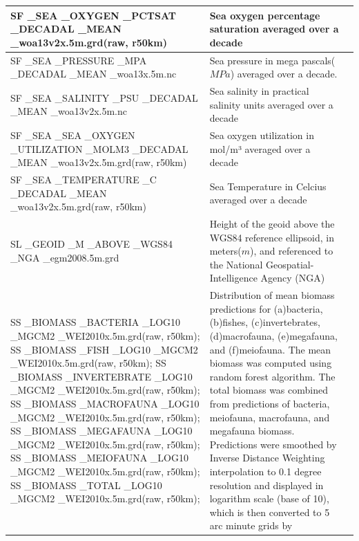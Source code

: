 \documentclass[journal abbreviation, manuscript]{copernicus}
\begin{document}
\begin{longtable}{|p{}|p{}|p{}|}
        SF \_SEA \_OXYGEN \_PCTSAT \_DECADAL \_MEAN \_woa13v2x.5m.grd(raw, r50km) & Sea oxygen percentage saturation averaged over a decade & \cite{WOA13X2013}\\
        \hline 
        SF \_SEA \_PRESSURE \_MPA \_DECADAL \_MEAN \_woa13x.5m.nc & Sea pressure in mega pascals($MPa$) averaged over a decade. & \cite{WOA13X2013} \\
        \hline 
        SF \_SEA \_SALINITY \_PSU \_DECADAL \_MEAN \_woa13v2x.5m.nc & Sea salinity in practical salinity units averaged over a decade & \cite{WOA13X2013} \\
        \hline 
        SF \_SEA \_SEA \_OXYGEN \_UTILIZATION \_MOLM3 \_DECADAL \_MEAN \_woa13v2x.5m.grd(raw, r50km) & Sea oxygen utilization in mol/m³ averaged over a decade &  \cite{WOA13X2013}\\
        \hline 
        SF \_SEA \_TEMPERATURE \_C \_DECADAL \_MEAN \_woa13v2x.5m.grd(raw, r50km) &  Sea Temperature in Celcius averaged over a decade & \cite{WOA13X2013} \\
        \hline 
        SL \_GEOID \_M \_ABOVE \_WGS84 \_NGA \_egm2008.5m.grd & Height of the geoid above the WGS84 reference ellipsoid, in meters($m$), and referenced to the National Geospatial-Intelligence Agency (NGA)
& \cite{NGA_EGM20082008} \\
        \hline 
        SS \_BIOMASS \_BACTERIA \_LOG10 \_MGCM2 \_WEI2010x.5m.grd(raw, r50km); SS \_BIOMASS \_FISH \_LOG10 \_MGCM2 \_WEI2010x.5m.grd(raw, r50km); SS \_BIOMASS \_INVERTEBRATE \_LOG10 \_MGCM2 \_WEI2010x.5m.grd(raw, r50km); SS \_BIOMASS \_MACROFAUNA \_LOG10 \_MGCM2 \_WEI2010x.5m.grd(raw, r50km); SS \_BIOMASS \_MEGAFAUNA \_LOG10 \_MGCM2 \_WEI2010x.5m.grd(raw, r50km); SS \_BIOMASS \_MEIOFAUNA \_LOG10 \_MGCM2 \_WEI2010x.5m.grd(raw, r50km); SS \_BIOMASS \_TOTAL \_LOG10 \_MGCM2 \_WEI2010x.5m.grd(raw, r50km); & Distribution of mean biomass predictions for (a)bacteria, (b)fishes, (c)invertebrates, (d)macrofauna, (e)megafauna, and (f)meiofauna. The mean biomass was computed using random forest algorithm. The total biomass was combined from predictions of bacteria, meiofauna, macrofauna, and megafauna biomass. Predictions were smoothed by Inverse Distance Weighting interpolation to 0.1 degree resolution and displayed in logarithm scale (base of 10), which is then converted to 5 arc minute grids by \cite{LeeTOCkNN} & \cite{WEI2010} \\
        \hline 

\end{longtable}
\end{document}
